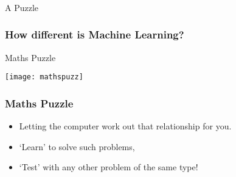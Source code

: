 
\begin{frame}[fragile]\frametitle{}
\begin{center}
{\Large A Puzzle}
\end{center}
\end{frame}

\begin{frame}[fragile]\frametitle{How different is Machine Learning?}
Maths Puzzle
\begin{center}
\texttt{[image: mathspuzz]}
\end{center}
\end{frame}

\begin{frame}[fragile]\frametitle{Maths Puzzle}
\begin{itemize}
\item Letting the computer work out that relationship for you. 
\item `Learn' to solve such problems, 
\item `Test' with any other problem of the same type!
\end{itemize}
\end{frame}

